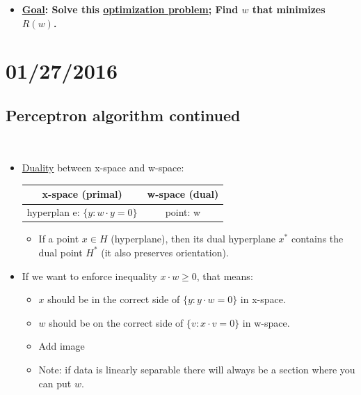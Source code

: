 \documentclass[10pt]{article}
\begin{document}
\begin{itemize}
			\item \textbf{\underline{Goal}: Solve this \underline{optimization problem}; Find $w$ that minimizes $R(w)$.}
	\end{itemize}

\newpage
\section*{01/27/2016}
	\subsection{Perceptron algorithm continued}
	\
		\begin{itemize}
			\item \underline{Duality} between x-space and w-space:\\
				\begin{center}
					\begin{tabular}{ c|c}
  						x-space (primal) & w-space (dual) \\
  						\hline
  						hyperplan	e: $\{y: w \cdot y = 0\}$ & point: w \\
  						\hline
					\end{tabular}
				\end{center}
				\begin{itemize}
					\item If a point $x \in H$ (hyperplane), then its dual hyperplane $x^{*}$ contains the dual point $H^{*}$ (it also preserves orientation).
				\end{itemize}
			
			\item If we want to enforce inequality $x \cdot w \geq 0$, that means:
				\begin{itemize}
					\item $x$ should be in the correct side of $\{y: y \cdot w = 0\}$ in x-space.
					\item $w$ should be on the correct side of $\{v: x \cdot v = 0\}$ in w-space.
					\item Add image
					\item Note: if data is linearly separable there will always be a section where you can put $w$.
				\end{itemize}
		\end{itemize}

\end{document}
